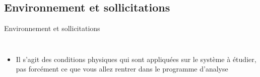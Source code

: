 \subsection{Environnement et sollicitations}
\label{sec:Environnement et sollicitations}

\begin{frame}[c]{Environnement et sollicitations}
  \begin{columns}
    \begin{itemize}
        \item Il s'agit des conditions physiques qui sont appliquées sur le système à étudier, pas forcément ce que vous allez rentrer dans le programme d'analyse
    \end{itemize}
    
  \end{columns}
\end{frame}